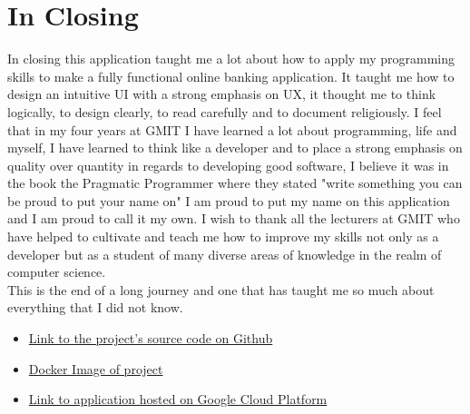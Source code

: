 \section{In Closing}
In closing this application taught me a lot about how to apply my programming skills to make a fully functional online banking application.  It taught me how to design an intuitive UI with a strong emphasis on UX, it thought me to think logically, to design clearly, to read carefully and to document religiously.  I feel that in my four years at GMIT I have learned a lot about programming, life and myself,  I have learned to think like a developer and to place a strong emphasis on quality over quantity in regards to developing good software,  I believe it was in the book the Pragmatic Programmer where they stated "write something you can be proud to put your name on" I am proud to put my name on this application and I am proud to call it my own.  I wish to thank all the lecturers at GMIT who have helped to cultivate and teach me how to improve my skills not only as a developer but as a student of many diverse areas of knowledge in the realm of computer science.
\\
This is the end of a long journey and one that has taught me so much about everything that I did not know.
\begin{appendices}
\begin{itemize}
\item \href{https://github.com/Ultan-Kearns/AppliedProject}{Link to the project's source code on Github}
\item \href{https://hub.docker.com/repository/docker/ultan/applied-project}{Docker Image of project}
\item \href{}{Link to application hosted on Google Cloud Platform}
\end{itemize}
\end{appendices}



